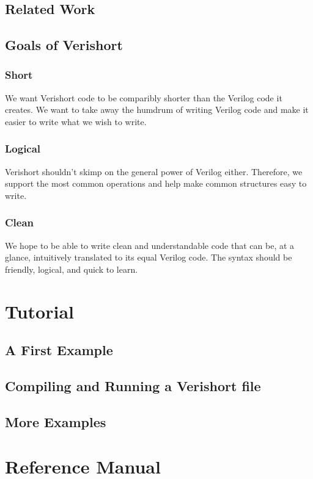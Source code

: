 \documentclass[letterpaper,11pt]{article}
\begin{document}
    \subsection{Related Work}
        \subsection{Goals of Verishort}
        \subsubsection{Short}
        We want Verishort code to be comparibly shorter than the Verilog code it creates. We want to
        take away the humdrum of writing Verilog code and make it easier to write what we wish to write. 
        \subsubsection{Logical}
        Verishort shouldn't skimp on the general power of Verilog either. Therefore, we support the most
        common operations and help make common structures easy to write. 
        \subsubsection{Clean}
        We hope to be able to write clean and understandable code that can be, at a glance, intuitively 
        translated to its equal Verilog code. The syntax should be friendly, logical, and quick to learn.



\section{Tutorial}
    \subsection{A First Example}
    \subsection{Compiling and Running a Verishort file}
    \subsection{More Examples}

\section{Reference Manual}
\end{document}
